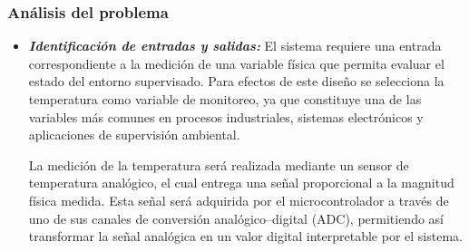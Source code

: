 \subsubsection{\textbf{Análisis del problema}}
\begin{itemize}
    \item \textbf{\textit{Identificación de entradas y salidas:}} El sistema requiere una entrada correspondiente a la medición de una variable física que permita evaluar el estado del entorno supervisado. Para efectos de este diseño se selecciona la temperatura como variable de monitoreo, ya que constituye una de las variables más comunes en procesos industriales, sistemas electrónicos y aplicaciones de supervisión ambiental.

    La medición de la temperatura será realizada mediante un sensor de temperatura analógico, el cual entrega una señal proporcional a la magnitud física medida. Esta señal será adquirida por el microcontrolador a través de uno de sus canales de conversión analógico–digital (ADC), permitiendo así transformar la señal analógica en un valor digital interpretable por el sistema.


\end{itemize}
